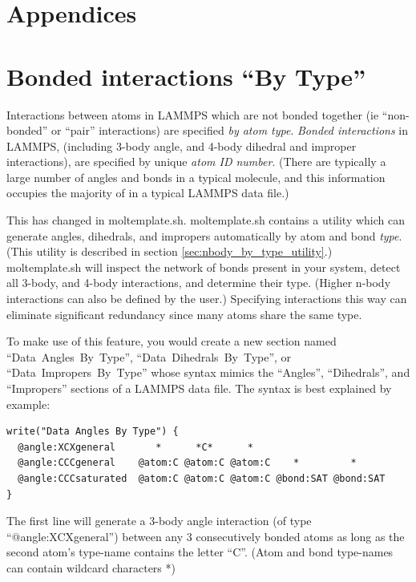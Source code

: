 \documentclass[11pt]{article}
\begin{document}
\appendix
\section*{Appendices}

\section{Bonded interactions ``By Type''}
\label{sec:nbody_by_type}

Interactions between atoms in LAMMPS which are not bonded together
(ie ``non-bonded'' or ``pair'' interactions) 
are specified \textit{by atom type}.
\textit{Bonded interactions} in LAMMPS, 
(including 3-body angle, and 4-body dihedral and improper interactions),
are specified by unique \textit{atom ID number}.
(There are typically a large number of angles and bonds in 
a typical molecule, and this information occupies the 
majority of in a typical LAMMPS data file.)

This has changed in moltemplate.sh.  moltemplate.sh contains a 
utility which can generate angles, dihedrals, and impropers
automatically by atom and bond \textit{type}.
(This utility is described in section \ref{sec:nbody_by_type_utility}.)
moltemplate.sh will inspect the network of bonds present in your system, 
detect all 3-body, and 4-body interactions, and determine their type.
(Higher n-body interactions can also be defined by the user.)
Specifying interactions this way can eliminate significant redundancy 
since many atoms share the same type. 

To make use of this feature, you would create a new section named
\mbox{``Data Angles By Type''}, \mbox{``Data Dihedrals By Type''}, 
or \mbox{``Data Impropers By Type''} 
whose syntax mimics the 
\mbox{``Angles''}, \mbox{``Dihedrals''}, and \mbox{``Impropers''} 
sections of a LAMMPS data file.
The syntax is best explained by example:

\begin{verbatim}
write("Data Angles By Type") {
  @angle:XCXgeneral       *      *C*      *
  @angle:CCCgeneral    @atom:C @atom:C @atom:C    *         *
  @angle:CCCsaturated  @atom:C @atom:C @atom:C @bond:SAT @bond:SAT
}
\end{verbatim}

The first line will generate a 3-body angle interaction 
(of type \mbox{``@angle:XCXgeneral''})
between any 3 consecutively bonded atoms 
as long as the second atom's type-name contains the letter ``C''.
(Atom and bond type-names can contain wildcard characters *)
\end{document}
